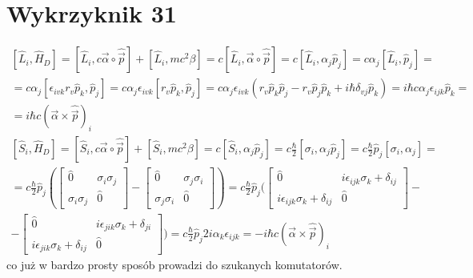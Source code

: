 \documentclass[a4paper,12pt]{article}
\begin{document}
\section{Wykrzyknik 31}
$$
\begin{gathered}
\left[\hat{L}_i,\hat{H}_D\right] = \left[\hat{L}_i,c\vec{\alpha}\circ\hat{\vec{p}}\right] + \left[\hat{L}_i,mc^2\beta \right] = c\left[\hat{L}_i,\vec{\alpha}\circ\hat{\vec{p}}\right] = c\left[\hat{L}_i, \alpha_j\hat{p}_j\right] = c\alpha_j \left[\hat{L}_i,\hat{p}_j\right] = \\
= c\alpha_j\left[\epsilon_{ivk}r_v\hat{p}_k,\hat{p}_j\right] = c\alpha_j\epsilon_{ivk}\left[r_v \hat{p}_k,\hat{p}_j\right] =  c\alpha_j\epsilon_{ivk}\left(r_v \hat{p}_k\hat{p}_j-r_v\hat{p}_j \hat{p}_k +i\hbar \delta_{vj}\hat{p}_k\right) = i\hbar c\alpha_j \epsilon_{ijk} \hat{p}_k = \\
= i\hbar c (\vec{\alpha}\times\hat{\vec{p}})_i
\end{gathered}
$$
$$
\begin{gathered}
\left[\hat{S}_i,\hat{H}_D\right] = \left[\hat{S}_i,c\vec{\alpha}\circ\hat{\vec{p}}\right] + \left[\hat{S}_i,mc^2\beta \right] = c\left[\hat{S}_i,\alpha_j\hat{p}_j\right] = c\frac{\hbar}{2}\left[\sigma_i ,\alpha_j\hat{p}_j\right] = c\frac{\hbar}{2}\hat{p}_j \left[\sigma_i,\alpha_j\right] = \\  = c\frac{\hbar}{2}\hat{p}_j \left( 
\begin{bmatrix}
\hat{0} & \sigma_i\sigma_j\\
\sigma_i\sigma_j & \hat{0}
\end{bmatrix} - \begin{bmatrix}
\hat{0} & \sigma_j\sigma_i\\
\sigma_j\sigma_i & \hat{0}
\end{bmatrix}
 \right) =c\frac{\hbar}{2}\hat{p}_j \bigg(\begin{bmatrix}
 \hat{0} & i\epsilon_{ijk}\sigma_k + \delta_{ij}\\
 i\epsilon_{ijk}\sigma_k + \delta_{ij} & \hat{0}
 \end{bmatrix} - \\ - \begin{bmatrix}
 \hat{0} & i\epsilon_{jik}\sigma_k + \delta_{ji}\\
 i\epsilon_{jik}\sigma_k + \delta_{ij} & \hat{0}
 \end{bmatrix} \bigg) =c\frac{\hbar}{2}\hat{p}_j 2i\alpha_k \epsilon_{ijk} = -i\hbar c(\vec{\alpha}\times\hat{\vec{p}})_i
\end{gathered}
$$
co już w bardzo prosty sposób prowadzi do szukanych komutatorów.
\end{document}
